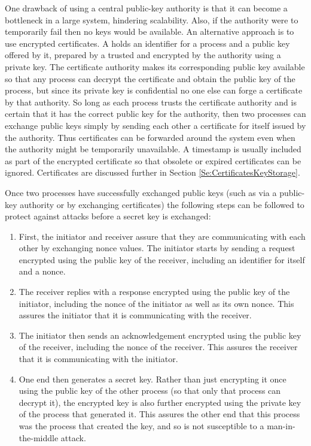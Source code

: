One drawback of using a central public-key authority is that it can become
a bottleneck in a large system, hindering scalability. Also, if the
authority were to temporarily fail then no keys would be available.
An alternative approach is to use encrypted certificates.
A  holds an identifier for a process and a public key offered
by it, prepared by a trusted 
and encrypted by the authority using a private key.
The certificate authority makes its corresponding public key available
so that any process can decrypt the certificate and obtain the public key
of the process, but since its private key is confidential no one else
can forge a certificate by that authority.
So long as each process trusts the certificate authority and is certain
that it has the correct public key for the authority, then two processes
can exchange public keys simply by sending each other a certificate
for itself issued by the authority.
Thus certificates can be forwarded around the system even when the authority
might be temporarily unavailable.
A timestamp is usually included as part of the encrypted certificate so that
obsolete or expired certificates can be ignored.
Certificates are discussed further in Section \ref{Se:CertificatesKeyStorage}.

Once two processes have successfully exchanged public keys
(such as via a public-key authority or by exchanging certificates)
the following steps can be followed to protect against attacks
before a secret key is exchanged:
\begin{enumerate}
  \item First, the initiator and receiver assure that they are communicating
  with each other by exchanging nonce values. The initiator starts by sending
  a request encrypted using the public key of the receiver,
  including an identifier for itself and a nonce.

  \item The receiver replies with a response encrypted using the public key
  of the initiator, including the nonce of the initiator as well as
  its own nonce. This assures the initiator that it is communicating with
  the receiver.

  \item The initiator then sends an acknowledgement encrypted using the
  public key of the receiver, including the nonce of the receiver.
  This assures the receiver that it is communicating with the initiator.

  \item One end then generates a secret key. Rather than just encrypting it once
  using the public key of the other process (so that only that process can decrypt
  it), the encrypted key is also further encrypted using the private key of the
  process that generated it. This assures the other end that this process
  was the process that created the key, and so is not susceptible to a
  man-in-the-middle attack.
\end{enumerate}


